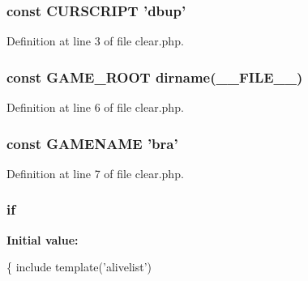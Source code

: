 \hypertarget{clear_8php_a39c39f525eceb86cabc338804f230e80}{
\subsubsection[{C\+U\+R\+S\+C\+R\+I\+P\+T}]{\setlength{\rightskip}{0pt plus 5cm}const C\+U\+R\+S\+C\+R\+I\+P\+T 'dbup'}}\label{clear_8php_a39c39f525eceb86cabc338804f230e80}


Definition at line 3 of file clear.\+php.

\hypertarget{clear_8php_a8e43cd27c8e744fff590983bc396aba3}{
\subsubsection[{G\+A\+M\+E\+\_\+\+R\+O\+O\+T}]{\setlength{\rightskip}{0pt plus 5cm}const G\+A\+M\+E\+\_\+\+R\+O\+O\+T dirname(\+\_\+\+\_\+\+F\+I\+L\+E\+\_\+\+\_\+)}}\label{clear_8php_a8e43cd27c8e744fff590983bc396aba3}


Definition at line 6 of file clear.\+php.

\hypertarget{clear_8php_a3cd7223880b2f6a1d0bcb325ce43c606}{
\subsubsection[{G\+A\+M\+E\+N\+A\+M\+E}]{\setlength{\rightskip}{0pt plus 5cm}const G\+A\+M\+E\+N\+A\+M\+E 'bra'}}\label{clear_8php_a3cd7223880b2f6a1d0bcb325ce43c606}


Definition at line 7 of file clear.\+php.

\hypertarget{clear_8php_ab023ce7e38a92e7f9a721b63855962e9}{
\subsubsection[{if}]{\setlength{\rightskip}{0pt plus 5cm}if}}\label{clear_8php_ab023ce7e38a92e7f9a721b63855962e9}
{\bfseries Initial value\+:}
\begin{DoxyCode}
\{   
    include \textcolor{keyword}{template}(\textcolor{stringliteral}{'alivelist'})
\end{DoxyCode}


